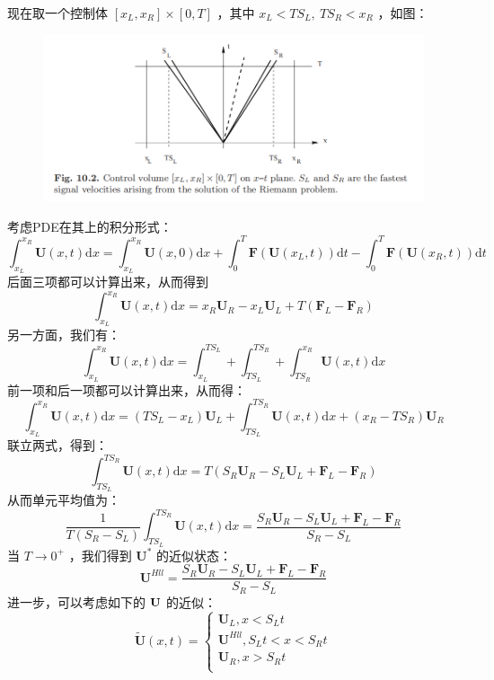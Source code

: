 \documentclass{book}
\begin{document}
现在取一个控制体 $[x_L,x_R]\times[0,T]$ ，其中 $x_L<TS_L,\ TS_R<x_R$ ，如图：
\begin{figure}[htp]
    \centering
    \label{fig:}
    \includegraphics[width=0.7\linewidth]{fig/HLL.png}
    \caption{}
\end{figure}
考虑PDE在其上的积分形式：
\begin{equation}
    \displaystyle\int_{x_L}^{x_R}\mathbf U(x,t)\mathrm dx=\displaystyle\int_{x_L}^{x_R}\mathbf U(x,0)\mathrm dx+\int_{0}^T\mathbf F(\mathbf U(x_L,t))\mathrm dt-\int_0^T\mathbf F(\mathbf U(x_R,t))\mathrm dt
\end{equation}
后面三项都可以计算出来，从而得到
\begin{equation}
    \displaystyle\int_{x_L}^{x_R}\mathbf U(x,t)\mathrm dx=x_R\mathbf U_R-x_L\mathbf U_L+T(\mathbf F_L-\mathbf F_R)
\end{equation}
另一方面，我们有：
\begin{equation}
    \displaystyle\int_{x_L}^{x_R}\mathbf U(x,t)\mathrm dx=\int_{x_L}^{TS_L}+\int_{TS_L}^{TS_R}+\int_{TS_R}^{x_R}\mathbf U(x,t)\mathrm dx
\end{equation}
前一项和后一项都可以计算出来，从而得：
\begin{equation}
    \displaystyle\int_{x_L}^{x_R}\mathbf U(x,t)\mathrm dx=(TS_L-x_L)\mathbf U_L+\int_{TS_L}^{TS_R}\mathbf U(x,t)\mathrm dx+(x_R-TS_R)\mathbf U_R
\end{equation}
联立两式，得到：
\begin{equation}
    \displaystyle\int_{TS_L}^{TS_R}\mathbf U(x,t)\mathrm dx=T(S_R\mathbf U_R-S_L\mathbf U_L+\mathbf F_L-\mathbf F_R)
\end{equation}
从而单元平均值为：
\begin{equation}
    \displaystyle\frac{1}{T(S_R-S_L)}\int_{TS_L}^{TS_R}\mathbf U(x,t)\mathrm dx=\frac{S_R\mathbf U_R-S_L\mathbf U_L+\mathbf F_L-\mathbf F_R}{S_R-S_L}
\end{equation}
当 $T\to0^+$ ，我们得到 $\mathbf U^*$ 的近似状态：
\begin{equation}
    \mathbf U^{Hll}=\displaystyle\frac{S_R\mathbf U_R-S_L\mathbf U_L+\mathbf F_L-\mathbf F_R}{S_R-S_L}
\end{equation}
进一步，可以考虑如下的 $\bf U$ 的近似：
\begin{equation}
    \mathbf{\tilde{U}}\left( x,t \right) =\begin{cases}
        \mathbf{U}_L,x<S_Lt          \\
        \mathbf{U}^{Hll},S_Lt<x<S_Rt \\
        \mathbf{U}_R,x>S_Rt          \\
    \end{cases}
\end{equation}
\end{document}
